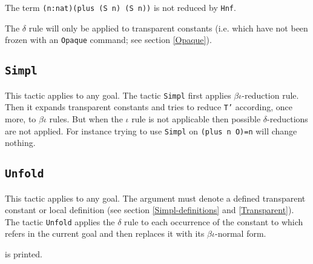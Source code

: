 \Example
The term \verb+(n:nat)(plus (S n) (S n))+ is not reduced by {\tt Hnf}.

\Rem The $\delta$ rule will only be applied to transparent constants
(i.e. which have not been frozen with an {\tt Opaque} command; see
section \ref{Opaque}).

\subsection{\tt Simpl}
This tactic applies to any goal. The
tactic {\tt Simpl} first applies $\beta\iota$-reduction rule.
Then it expands transparent constants and tries to reduce {\tt T'}
according, once more, to 
$\beta\iota$ rules. But when the $\iota$ rule is not applicable then
possible $\delta$-reductions are not applied.  For instance trying to
use {\tt Simpl} on {\tt (plus n O)=n} will change nothing.


\subsection{\tt Unfold \qualid}
\label{Unfold}
This tactic applies to any goal. The argument {\qualid} must denote
a defined transparent constant or local definition (see section
\ref{Simpl-definitions} and \ref{Transparent}). 
The tactic {\tt Unfold} applies the
$\delta$ rule to each occurrence of the constant to which {\qualid} refers
 in the current goal and
then replaces it with its $\beta\iota$-normal form.

\begin{ErrMsgs}
\item {\qualid} 
is printed.

\end{ErrMsgs}

